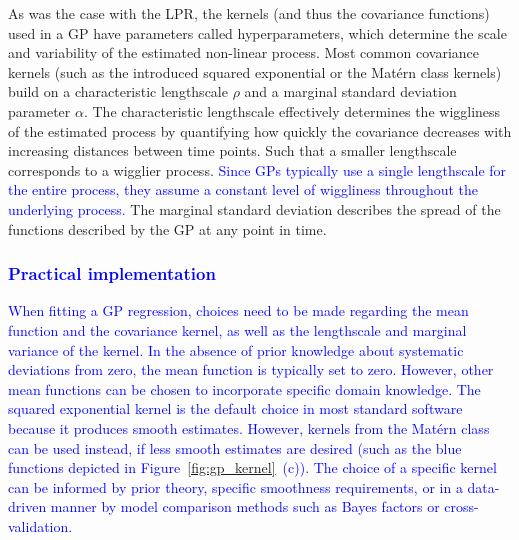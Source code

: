 \documentclass[man, floatsintext]{apa7}
\begin{document}
As was the case with the LPR, the kernels (and thus the covariance functions)
used in a GP have parameters called hyperparameters, which determine the scale
and variability of the estimated non-linear process. Most common covariance
kernels (such as the introduced squared exponential or the Matérn class
kernels) build on a characteristic lengthscale $\rho$ and a marginal standard
deviation parameter $\alpha$. The characteristic lengthscale effectively
determines the wiggliness of the estimated process by quantifying how quickly
the covariance decreases with increasing distances between time points. Such
that a smaller lengthscale corresponds to a wigglier process.
\textcolor{blue}{Since GPs typically use a single lengthscale for the entire
  process, they assume a constant level of wiggliness throughout
  the underlying process.}
The marginal standard deviation describes the spread of the functions described
by the GP at any point in time.

\subsubsection{\textcolor{blue}{Practical implementation}}

\textcolor{blue}{
  When fitting a GP regression, choices need to be made regarding the mean
  function and the covariance kernel, as well as the lengthscale and marginal
  variance of the kernel. In the absence of prior knowledge about systematic
  deviations from zero, the mean function is typically set to zero. However,
  other mean functions can be chosen to incorporate specific domain knowledge.
  The squared exponential kernel is the default choice in most standard
  software because it produces smooth estimates. However, kernels from the
  Matérn class can be used instead, if less smooth estimates are desired (such
  as the blue functions depicted in Figure~\ref{fig:gp_kernel}~(c)). The choice
  of a specific kernel can be informed by prior theory, specific smoothness
  requirements, or in a data-driven manner by model comparison methods such as
  Bayes factors or cross-validation.
}
\end{document}
